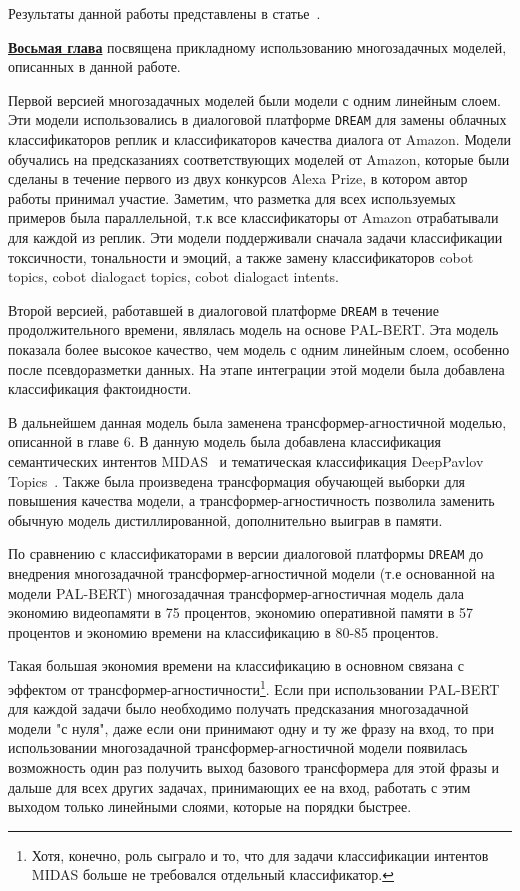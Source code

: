 Результаты данной работы представлены в статье~\cite{rutopics}.

\underline{\textbf{Восьмая глава}} посвящена прикладному использованию многозадачных моделей, описанных в данной работе.

Первой версией многозадачных моделей были модели с одним линейным слоем. Эти модели использовались в диалоговой платформе \texttt{DREAM} для замены облачных классификаторов реплик и классификаторов качества диалога от Amazon. Модели обучались на предсказаниях соответствующих моделей от Amazon, которые были сделаны в течение первого из двух конкурсов Alexa Prize, в котором автор работы принимал участие. Заметим, что разметка для всех используемых примеров была параллельной, т.к все классификаторы от Amazon отрабатывали для каждой из реплик. Эти модели поддерживали сначала задачи классификации токсичности, тональности и эмоций, а также замену классификаторов cobot topics, cobot dialogact topics, cobot dialogact intents.

Второй версией, работавшей в диалоговой платформе \texttt{DREAM} в течение продолжительного времени, являлась модель на основе PAL-BERT. Эта модель показала более высокое качество, чем модель с одним линейным слоем, особенно после псевдоразметки данных. На этапе интеграции этой модели была добавлена классификация фактоидности.

В дальнейшем данная модель была заменена трансформер-агностичной моделью, описанной в главе 6. В данную модель была добавлена классификация семантических интентов MIDAS~\cite{midas} и тематическая классификация DeepPavlov Topics~\cite{dp_topics}. Также была произведена трансформация обучающей выборки для повышения качества модели, а трансформер-агностичность позволила заменить обычную модель дистиллированной, дополнительно выиграв в памяти.

По сравнению с классификаторами в версии диалоговой платформы \texttt{DREAM} до внедрения многозадачной трансформер-агностичной модели (т.е основанной на модели PAL-BERT) многозадачная трансформер-агностичная модель дала экономию видеопамяти в 75 процентов, экономию оперативной памяти в 57 процентов и экономию времени на классификацию в 80-85 процентов.
 
Такая большая экономия времени на классификацию в основном связана с эффектом от трансформер-агностичности\footnote{Хотя, конечно, роль сыграло и то, что для задачи классификации интентов MIDAS больше не требовался отдельный классификатор.}. Если при использовании PAL-BERT для каждой задачи было необходимо получать предсказания многозадачной модели "с нуля", даже если они принимают одну и ту же фразу на вход, то при использовании многозадачной трансформер-агностичной модели появилась возможность один раз получить выход базового трансформера для этой фразы и дальше для всех других задачах, принимающих ее на вход, работать с этим выходом только линейными слоями, которые на порядки быстрее. 

